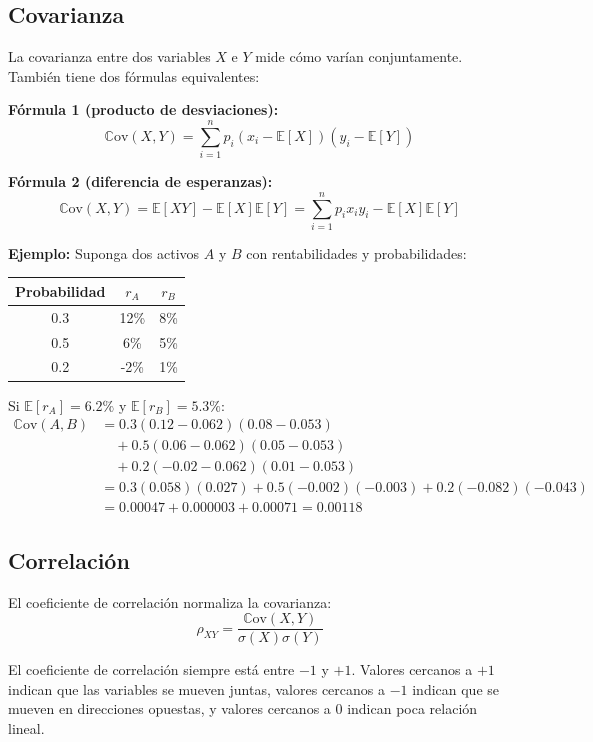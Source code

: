 \documentclass[12pt,a4paper]{article}
\newcommand{\E}{\mathbb{E}}
\newcommand{\Cov}{\mathbb{C}\text{ov}}
\begin{document}
\subsection*{Covarianza}

La covarianza entre dos variables $X$ e $Y$ mide cómo varían conjuntamente. También tiene dos fórmulas equivalentes:

\textbf{Fórmula 1 (producto de desviaciones):}
\[
\Cov(X,Y) = \sum_{i=1}^{n} p_i (x_i - \E[X])(y_i - \E[Y])
\]

\textbf{Fórmula 2 (diferencia de esperanzas):}
\[
\Cov(X,Y) = \E[XY] - \E[X]\E[Y] = \sum_{i=1}^{n} p_i x_i y_i - \E[X]\E[Y]
\]

\textbf{Ejemplo:} Suponga dos activos $A$ y $B$ con rentabilidades y probabilidades:
\begin{center}
\begin{tabular}{ccc}
Probabilidad & $r_A$ & $r_B$ \\
\hline
0.3 & 12\% & 8\% \\
0.5 & 6\% & 5\% \\
0.2 & -2\% & 1\% \\
\end{tabular}
\end{center}

Si $\E[r_A] = 6.2\%$ y $\E[r_B] = 5.3\%$:
\begin{align*}
\Cov(A,B) &= 0.3(0.12-0.062)(0.08-0.053) \\
          &\quad + 0.5(0.06-0.062)(0.05-0.053) \\
          &\quad + 0.2(-0.02-0.062)(0.01-0.053)\\
          &= 0.3(0.058)(0.027) + 0.5(-0.002)(-0.003) + 0.2(-0.082)(-0.043)\\
          &= 0.00047 + 0.000003 + 0.00071 = 0.00118
\end{align*}

\subsection*{Correlación}

El coeficiente de correlación normaliza la covarianza:
\[
\rho_{XY} = \frac{\Cov(X,Y)}{\sigma(X) \sigma(Y)}
\]

El coeficiente de correlación siempre está entre $-1$ y $+1$. Valores cercanos a $+1$ indican que las variables se mueven juntas, valores cercanos a $-1$ indican que se mueven en direcciones opuestas, y valores cercanos a $0$ indican poca relación lineal.
\end{document}
